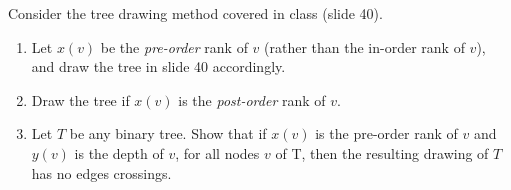 Consider the tree drawing method covered in class (slide 40).

\begin{enumerate}

\item  Let $x(v)$ be the {\em pre-order} rank of $v$ (rather than the in-order
      rank of $v$), and draw the tree in slide 40 accordingly.

\item  Draw the tree if $x(v)$ is the {\em post-order} rank of $v$.

\item  Let $T$ be any binary tree.  Show that if $x(v)$ is the pre-order rank
      of $v$ and $y(v)$ is the depth of $v$, for all nodes $v$ of T,
      then the resulting drawing of $T$ has no edges crossings.

\end{enumerate}
